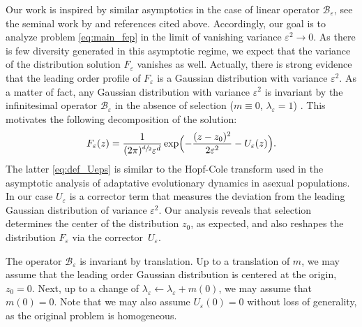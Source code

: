 \documentclass[JEP,XML,SOM,Unicode]{cedram}
\let\mathcal\mathscr
\newcommand{\cB}{\mathcal{B}}
\theoremstyle{plain}
\theoremstyle{definition}
\let\eps\varepsilon
\begin{document}
Our work is inspired by similar asymptotics in the case of linear operator $\cB_\eps$, see the seminal work by \cite{diekmann2005} and references cited above. Accordingly, our goal is to analyze problem \eqref{eq:main_fep} in the limit of vanishing variance $\eps^2\to 0$. As there is few diversity generated in this asymptotic regime, we expect that the variance of the distribution solution $F_\eps$ vanishes as well. Actually, there is strong evidence that the leading order profile of $F_\eps$ is a Gaussian distribution with variance $\eps^2$. As a matter of fact, any Gaussian distribution with variance $\eps^2$ is invariant by the infinitesimal operator $\cB_\eps$ in the absence of selection ($m \equiv 0$, $\lambda_\eps = 1$) \cite{menormal,raoulmirrahimiinfinitesimal}. This motivates the following decomposition of the solution: \begin{equation}\label{eq:def_Ueps}
F_\eps(z) = \dfrac{1}{(2\pi)^{\sfrac d2} \eps^d} \exp\Bigl(-\dfrac{(z -z_0)^2}{2\eps^2} - U_\eps(z) \Bigr).
\end{equation}
The latter \eqref{eq:def_Ueps} is similar to the Hopf-Cole transform used in the asymptotic analysis of adaptative evolutionary dynamics in asexual populations. In our case $U_\eps$ is a corrector term that measures the deviation from the leading Gaussian distribution of variance $\eps^2$. Our analysis reveals that selection determines the center of the distribution $z_0$, as expected, and also reshapes the distribution $F_\eps$ via the corrector~$U_\eps$.

The operator $\cB_\eps$ is invariant by translation. Up to a translation of $m$, we may assume that the leading order Gaussian distribution is centered at the origin, \ie $z_0 = 0$. Next, up to a change of $\lambda_\eps \leftarrow \lambda_\eps + m(0)$, we may assume that $m(0) = 0$. Note that we may also assume $U_\eps(0) = 0$ without loss of generality, as the original problem is homogeneous.
\end{document}
